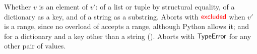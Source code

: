 Whether $v$ is an element of $v'$: of a list or tuple by structural equality, of a dictionary as a key,
and of a string as a substring. Aborts with $\textcolor{red}{\mathsf{excluded}}$ when $v'$ is a range, since no overload of  accepts a range, although Python allows it; and for a dictionary and a key other than a string (). Aborts with $\mathsf{TypeError}$ for any other pair of values.
